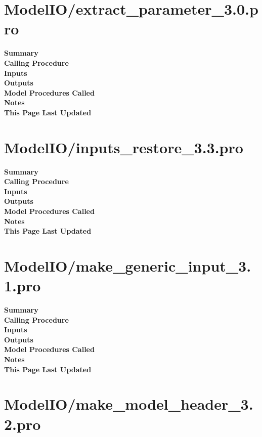 \documentclass[11pt]{article}
\newcommand\descrip[1]{\textsf{\textbf{\large{#1}}}\\}
\begin{document}
\section{ModelIO/extract\_parameter\_3.0.pro} \label{sec:extract_parameter}

\descrip{Summary}

\descrip{Calling Procedure}

\descrip{Inputs}

\descrip{Outputs}

\descrip{Model Procedures Called}

\descrip{Notes}

\descrip{This Page Last Updated}

\clearpage

\section{ModelIO/inputs\_restore\_3.3.pro} \label{sec:inputs_restore}

\descrip{Summary}

\descrip{Calling Procedure}

\descrip{Inputs}

\descrip{Outputs}

\descrip{Model Procedures Called}

\descrip{Notes}

\descrip{This Page Last Updated}

\clearpage

\section{ModelIO/make\_generic\_input\_3.1.pro} \label{sec:make_generic_input}

\descrip{Summary}

\descrip{Calling Procedure}

\descrip{Inputs}

\descrip{Outputs}

\descrip{Model Procedures Called}

\descrip{Notes}

\descrip{This Page Last Updated}

\clearpage

\section{ModelIO/make\_model\_header\_3.2.pro} \label{sec:make_model_header}
\end{document}
